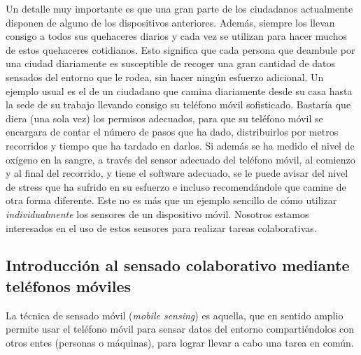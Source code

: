 Un detalle muy importante es que una gran parte de los ciudadanos actualmente disponen de alguno de los dispositivos anteriores. Además, siempre los llevan consigo a todos sus quehaceres diarios y cada vez se utilizan para hacer muchos de estos quehaceres cotidianos. Esto significa que cada persona que deambule por una ciudad diariamente es susceptible de recoger una gran cantidad de datos sensados del entorno que le rodea, sin hacer ningún esfuerzo adicional. Un ejemplo usual es el de un ciudadano que camina diariamente desde su casa hasta la sede de su trabajo llevando consigo su teléfono móvil sofisticado. Bastaría que diera (una sola vez) los permisos adecuados, para que su teléfono móvil se encargara de contar el número de pasos que ha dado, distribuirlos por metros recorridos y tiempo que ha tardado en darlos. Si además se ha medido el nivel de oxígeno en la sangre, a través del sensor adecuado del teléfono móvil, al comienzo y al final del recorrido, y tiene el software adecuado, se le puede avisar del nivel de stress que ha sufrido en su esfuerzo e incluso recomendándole que camine de otra forma diferente. Este no es más que un ejemplo sencillo de cómo utilizar \emph{individualmente} los sensores de un dispositivo móvil. Nosotros estamos interesados en el uso de estos sensores para realizar tareas colaborativas.

\subsection{Introducción al sensado colaborativo mediante teléfonos móviles}

La técnica de sensado móvil (\emph{mobile sensing}) \cite{MobileSensing} es aquella, que en sentido amplio permite usar el teléfono móvil para sensar datos del entorno compartiéndolos con otros entes (personas o máquinas), para lograr llevar a cabo una tarea en común.

